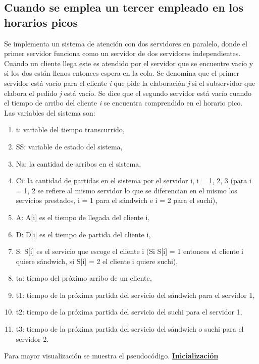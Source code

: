 \documentclass{book}
\begin{document}
		\subsection{Cuando se emplea un tercer empleado en los horarios picos}
			Se implementa un sistema de atenci\'on con dos servidores en paralelo, donde el primer servidor funciona como un servidor de dos servidores independientes. Cuando un cliente llega este es atendido por el servidor que se encuentre vac\'io y si los dos est\'an llenos entonces espera en la cola. Se denomina que el primer servidor est\'a vac\'io para el cliente \textit{i} que pide la elaboraci\'on \textit{j} si el subservidor que elabora el pedido \textit{j} est\'a vac\'io. Se dice que el segundo servidor est\'a vac\'io cuando el tiempo de arribo del cliente \textit{i} se encuentra comprendido en el horario pico. \\
			Las variables del sistema son:
			\begin{enumerate}
				\item t: variable del tiempo transcurrido,
				\item SS: variable de estado del sistema,
				\item Na: la cantidad de arribos en el sistema,
				\item Ci: la cantidad de partidas en el sistema por el servidor i, i = 1, 2, 3 (para i = 1, 2 se refiere al mismo servidor lo que se diferencian en el mismo los servicios prestados, i = 1 para el s\'andwich e i = 2 para el suchi),
				\item A: A[i] es el tiempo de llegada del cliente i,
				\item D: D[i] es el tiempo de partida del cliente i,
				\item S: S[i] es el servicio que escoge el cliente i (Si S[i] = 1 entonces el cliente i quiere s\'andwich, si S[i] = 2 el cliente i quiere suchi),
				\item ta: tiempo del pr\'oximo arribo de un cliente,
				\item t1: tiempo de la pr\'oxima partida del servicio del s\'andwich para el servidor 1,
				\item t2: tiempo de la pr\'oxima partida del servicio del suchi para el servidor 1,
				\item t3: tiempo de la pr\'oxima partida del servicio del s\'andwich o suchi para el servidor 2.
			\end{enumerate}
			
			Para mayor visualizaci\'on se muestra el pseudoc\'odigo.
			\underline{\textbf{Inicializaci\'on}}
			\begin{algorithmic}
			\end{algorithmic}
			
\end{document}
